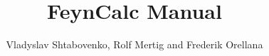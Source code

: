 \documentclass[11pt,a4paper,
parskip=half, %
]{scrreprt}
\author{}
\date{}
\begin{document}
	
\title{FeynCalc Manual}
\author{Vladyslav Shtabovenko, Rolf Mertig and Frederik Orellana}
\maketitle

\tableofcontents
	

%
%
%
\end{document}
